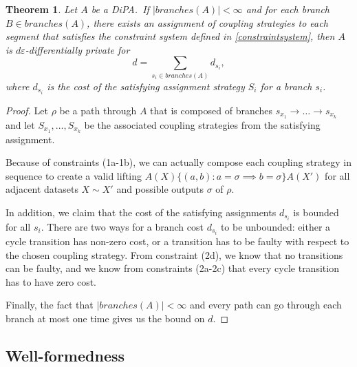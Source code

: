 \documentclass[12pt]{article}
\newtheorem{thm}{Theorem}[section]
\theoremstyle{definition}
\begin{document}
\begin{thm}\label{constraintsatisfiableprivatethm}
    Let $A$ be a DiPA.\ If $|branches(A)|< \infty$ and for each branch $B\in branches(A)$, there exists an assignment of coupling strategies to each segment that satisfies the constraint system defined in \ref{constraintsystem}, then $A$ is $d\varepsilon$-differentially private for \[d=\sum_{s_i\in branches(A)}d_{s_i},\]
    where $d_{s_i}$ is the cost of the satisfying assignment strategy $S_i$ for a branch $s_i$.  
\end{thm}
\begin{proof}
    Let $\rho$ be a path through $A$ that is composed of branches $s_{x_1}\to \ldots\to s_{x_k}$ and let $S_{x_1}, \ldots, S_{x_k}$ be the associated coupling strategies from the satisfying assignment. 

    Because of constraints (1a-1b), we can actually compose each coupling strategy in sequence to create a valid lifting $A(X)\{(a, b): a=\sigma \implies b=\sigma\}A(X')$ for all adjacent datasets $X\sim X'$ and possible outputs $\sigma$ of $\rho$. 

    In addition, we claim that the cost of the satisfying assignments $d_{s_i}$ is bounded for all $s_i$. There are two ways for a branch cost $d_{s_i}$ to be unbounded: either a cycle transition has non-zero cost, or a transition has to be faulty with respect to the chosen coupling strategy. From constraint (2d), we know that no transitions can be faulty, and we know from constraints (2a-2c) that every cycle transition has to have zero cost. 

    Finally, the fact that $|branches(A)|<\infty$ and every path can go through each branch at most one time gives us the bound on $d$. 
\end{proof}


\subsection{Well-formedness}
\end{document}
